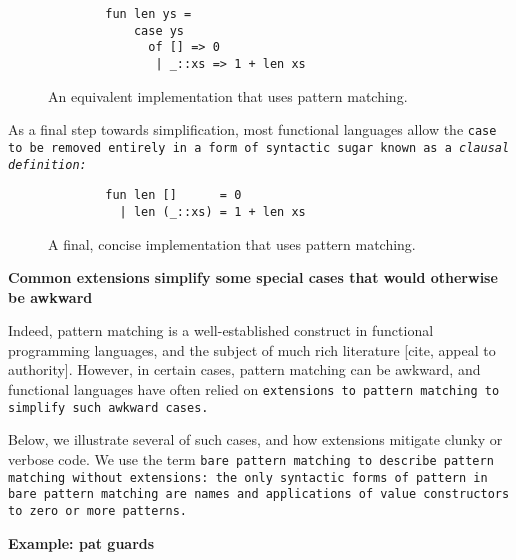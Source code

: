\documentclass[manuscript,screen,review, 12pt]{acmart}
\begin{document}
\begin{outline}[enumerate]
\begin{figure}[htt]
    \smllst
    \begin{lstlisting}
        fun len ys =
            case ys 
              of [] => 0
               | _::xs => 1 + len xs
        \end{lstlisting}
    \caption{An equivalent implementation that uses pattern matching.}
    \label{fig:pmlen}
    \end{figure}

    As a final step towards simplification, most functional languages allow the
    \tt{case} to be removed entirely in a form of syntactic sugar known as a
    \it{clausal definition}:

    \begin{figure}[ht]
    \smllst
    \begin{lstlisting}
        fun len []      = 0
          | len (_::xs) = 1 + len xs
        \end{lstlisting}
    \caption{A final, concise implementation that uses pattern matching.}
    \label{fig:pmclausallen}
    \end{figure}
        

     \bf{Common extensions simplify some special cases that would otherwise be awkward}

    Indeed, pattern matching is a well-established construct in functional
    programming languages, and the subject of much rich literature [cite, appeal
    to authority]. However, in certain cases, pattern matching can be awkward,
    and functional languages have often relied on \tt{extensions} to pattern
    matching to simplify such awkward cases. 

    Below, we illustrate several of such cases, and how extensions mitigate 
    clunky or verbose code. We use the term \tt{bare pattern matching} to 
    describe pattern matching \tt{without} extensions: the only syntactic 
    forms of pattern in bare pattern matching are names and applications of 
    value constructors to zero or more patterns. 
    
    
     \bf{Example: pat guards} 


\end{outline}
\end{document}
